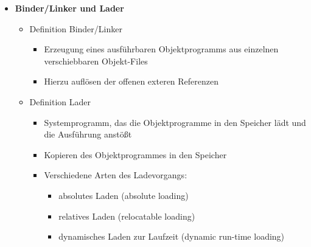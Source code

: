\begin{itemize}
        \item \textbf{Binder/Linker und Lader}
            \begin{itemize}
                \item Definition Binder/Linker
                    \begin{itemize}
                        \item Erzeugung eines ausführbaren Objektprogramms aus einzelnen verschiebbaren Objekt-Files
                        \item Hierzu auflösen der offenen exteren Referenzen
                    \end{itemize}
                \item Definition Lader
                    \begin{itemize}
                        \item Systemprogramm, das die Objektprogramme in den Speicher lädt und die Ausführung anstö\ss t
                        \item Kopieren des Objektprogrammes in den Speicher
                        \item Verschiedene Arten des Ladevorgangs:
                            \begin{itemize}
                                \item absolutes Laden (absolute loading)
                                \item relatives Laden (relocatable loading)
                                \item dynamisches Laden zur Laufzeit (dynamic run-time loading)
                            \end{itemize}
                    \end{itemize}
            \end{itemize}


\end{itemize}

